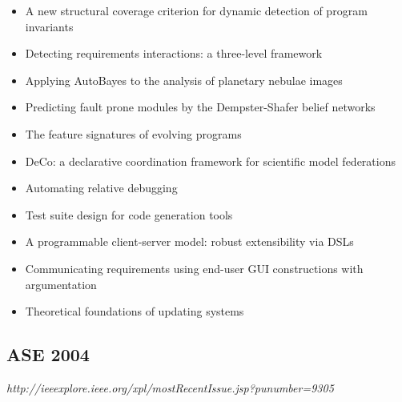 {\begin{itemize}[itemsep=-1ex]
  \item A new structural coverage criterion for dynamic detection of program invariants
  \item Detecting requirements interactions: a three-level framework
  \item Applying AutoBayes to the analysis of planetary nebulae images
  \item Predicting fault prone modules by the Dempster-Shafer belief networks
  \item The feature signatures of evolving programs
  \item DeCo: a declarative coordination framework for scientific model federations
  \item Automating relative debugging
  \item Test suite design for code generation tools
  \item A programmable client-server model: robust extensibility via DSLs
  \item Communicating requirements using end-user GUI constructions with argumentation
  \item Theoretical foundations of updating systems
\end{itemize}
}

\subsection{ASE 2004}

{\small \em http://ieeexplore.ieee.org/xpl/mostRecentIssue.jsp?punumber=9305}

